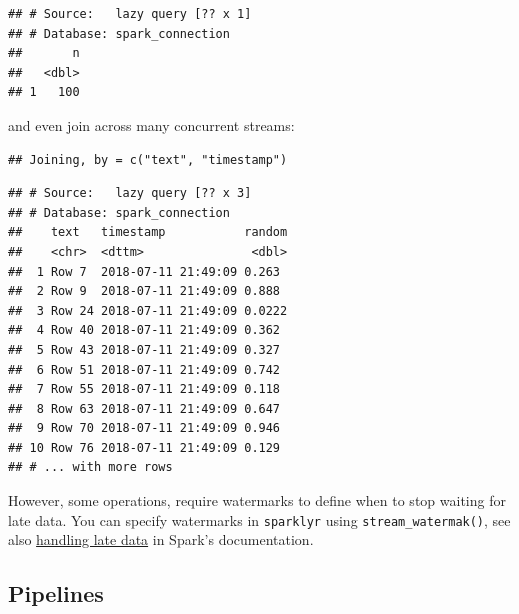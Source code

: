 \documentclass[]{book}
\newenvironment{Shaded}{\begin{snugshade}}{\end{snugshade}}
\newcommand{\DataTypeTok}[1]{\textcolor[rgb]{0.13,0.29,0.53}{#1}}
\newcommand{\KeywordTok}[1]{\textcolor[rgb]{0.13,0.29,0.53}{\textbf{#1}}}
\newcommand{\NormalTok}[1]{#1}
\newcommand{\OperatorTok}[1]{\textcolor[rgb]{0.81,0.36,0.00}{\textbf{#1}}}
\newcommand{\StringTok}[1]{\textcolor[rgb]{0.31,0.60,0.02}{#1}}
\theoremstyle{definition}
\theoremstyle{definition}
\theoremstyle{definition}
\theoremstyle{remark}
\begin{document}
\begin{verbatim}
## # Source:   lazy query [?? x 1]
## # Database: spark_connection
##       n
##   <dbl>
## 1   100
\end{verbatim}

and even join across many concurrent streams:

\begin{Shaded}
\end{Shaded}

\begin{verbatim}
## Joining, by = c("text", "timestamp")
\end{verbatim}

\begin{verbatim}
## # Source:   lazy query [?? x 3]
## # Database: spark_connection
##    text   timestamp           random
##    <chr>  <dttm>               <dbl>
##  1 Row 7  2018-07-11 21:49:09 0.263 
##  2 Row 9  2018-07-11 21:49:09 0.888 
##  3 Row 24 2018-07-11 21:49:09 0.0222
##  4 Row 40 2018-07-11 21:49:09 0.362 
##  5 Row 43 2018-07-11 21:49:09 0.327 
##  6 Row 51 2018-07-11 21:49:09 0.742 
##  7 Row 55 2018-07-11 21:49:09 0.118 
##  8 Row 63 2018-07-11 21:49:09 0.647 
##  9 Row 70 2018-07-11 21:49:09 0.946 
## 10 Row 76 2018-07-11 21:49:09 0.129 
## # ... with more rows
\end{verbatim}

However, some operations, require watermarks to define when to stop
waiting for late data. You can specify watermarks in \texttt{sparklyr}
using \texttt{stream\_watermak()}, see also
\href{https://spark.apache.org/docs/latest/structured-streaming-programming-guide.html\#handling-late-data-and-watermarking}{handling
late data} in Spark's documentation.

\hypertarget{streams-pipelines}{%
\subsection{Pipelines}\label{streams-pipelines}}
\end{document}
